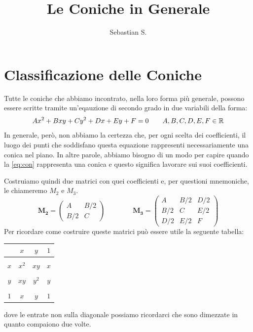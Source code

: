 \documentclass[a4paper, oneside]{article}
\title{Le Coniche in Generale}
\author{Sebastian S.}
\date{}
\begin{document}
	
	\maketitle

	\section{Classificazione delle Coniche}
		Tutte le coniche che abbiamo incontrato, nella loro forma più generale, possono essere scritte tramite un'eqauzione di secondo grado in due variabili della forma:
		\begin{equation} \label{eq:con}
			Ax^2+Bxy+Cy^2+Dx+Ey+F=0 \qquad A,B,C,D,E,F \in \mathbb{R}
		\end{equation}
		In generale, però, non abbiamo la certezza che, per ogni scelta dei coefficienti, il luogo dei punti che soddisfano questa equazione rappresenti necessariamente una conica nel piano. In altre parole, abbiamo bisogno di un modo per capire quando la \eqref{eq:con} rappresenta una conica e questo significa lavorare sui suoi coefficienti. \par 
		
		Costruiamo quindi due matrici con quei coefficienti e, per questioni mnemoniche, le chiameremo $M_2$ e $M_3$. 
		\begin{equation*}
			\mathbf{M_2} = \left(
			\begin{array}{cc}
				A & B/2 \\
				B/2 & C
			\end{array} \right)
			\qquad \qquad
			\mathbf{M_3} = \left(
			\begin{array}{ccc}
				A & B/2 & D/2 \\
				B/2 & C & E/2 \\
				D/2 & E/2 & F
			\end{array} \right)
		\end{equation*}
		Per ricordare come costruire queste matrici può essere utile la seguente tabella:
		\begin{center}
			\begin{tabular}{c|ccc}
				\phantom{x} & $x$ & $y$ & $1$ \\
				\hline \\
				$x$ & $x^2$ & $xy$ & $x$ \\ \\
				$y$ & $xy$ & $y^2$ & $y$ \\  \\
				$1$ & $x$ & $y$ & $1$ \\
			\end{tabular}
		\end{center}
		\vspace{3pt}
		dove le entrate non sulla diagonale possiamo ricordarci che sono dimezzate in quanto compaiono due volte.
		
\end{document}
